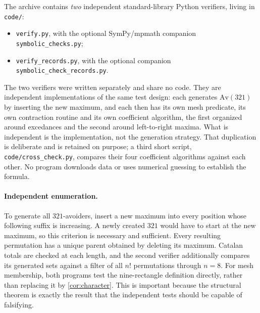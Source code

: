 \documentclass[11pt,letterpaper]{article}
\numberwithin{equation}{section}
\theoremstyle{definition}
\begin{document}
The archive contains \emph{two} independent standard-library Python
verifiers, living in \texttt{code/}:
\begin{itemize}
\item \texttt{verify.py}, with the optional SymPy/mpmath companion
 \texttt{symbolic\_checks.py};
\item \texttt{verify\_records.py}, with the optional companion
 \texttt{symbolic\_check\_records.py}.
\end{itemize}
The two verifiers were written separately and share no code.  They are
independent implementations of the same test design: each generates
$\mathrm{Av}(321)$ by inserting the new maximum, and each then has its own
mesh predicate, its own contraction routine and its own coefficient
algorithm, the first organized around excedances and the second around
left-to-right maxima.  What is independent is the implementation, not the
generation strategy.
That duplication is deliberate and is retained on purpose; a third short
script, \texttt{code/cross\_check.py}, compares their four coefficient
algorithms against each other. No program downloads data or uses
numerical guessing to establish the formula.

\paragraph{Independent enumeration.}
To generate all $321$-avoiders, insert a new maximum into every position
whose following suffix is increasing. A newly created $321$ would have
to start at the new maximum, so this criterion is necessary and
sufficient. Every resulting permutation has a unique parent obtained by
deleting its maximum. Catalan totals are checked at each length, and the
second verifier additionally compares its generated sets against a filter
of all $n!$ permutations through $n=8$.
For mesh membership, both programs test the nine-rectangle definition
directly, rather than replacing it by \cref{cor:character}.
This is important because the structural theorem is exactly the result
that the independent tests should be capable of falsifying.
\end{document}
